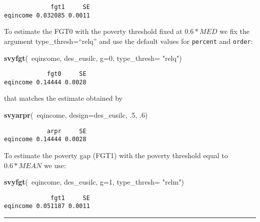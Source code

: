 \documentclass[]{book}
\newenvironment{Shaded}{\begin{snugshade}}{\end{snugshade}}
\newcommand{\KeywordTok}[1]{\textcolor[rgb]{0.13,0.29,0.53}{\textbf{{#1}}}}
\newcommand{\DataTypeTok}[1]{\textcolor[rgb]{0.13,0.29,0.53}{{#1}}}
\newcommand{\DecValTok}[1]{\textcolor[rgb]{0.00,0.00,0.81}{{#1}}}
\newcommand{\StringTok}[1]{\textcolor[rgb]{0.31,0.60,0.02}{{#1}}}
\newcommand{\NormalTok}[1]{{#1}}
\begin{document}
\begin{verbatim}
             fgt1     SE
eqincome 0.032085 0.0011
\end{verbatim}

To estimate the FGT0 with the poverty threshold fixed at \(0.6* MED\) we
fix the argument type\_thresh=``relq'' and use the default values for
\texttt{percent} and \texttt{order}:

\begin{Shaded}
\begin{Highlighting}[]
\KeywordTok{svyfgt}\NormalTok{(~eqincome, des_eusilc, }\DataTypeTok{g=}\DecValTok{0}\NormalTok{, }\DataTypeTok{type_thresh=} \StringTok{"relq"}\NormalTok{)}
\end{Highlighting}
\end{Shaded}

\begin{verbatim}
            fgt0     SE
eqincome 0.14444 0.0028
\end{verbatim}

that matches the estimate obtained by

\begin{Shaded}
\begin{Highlighting}[]
\KeywordTok{svyarpr}\NormalTok{(~eqincome, }\DataTypeTok{design=}\NormalTok{des_eusilc, .}\DecValTok{5}\NormalTok{, .}\DecValTok{6}\NormalTok{)}
\end{Highlighting}
\end{Shaded}

\begin{verbatim}
            arpr     SE
eqincome 0.14444 0.0028
\end{verbatim}

To estimate the poverty gap (FGT1) with the poverty threshold equal to
\(0.6*MEAN\) we use:

\begin{Shaded}
\begin{Highlighting}[]
\KeywordTok{svyfgt}\NormalTok{(~eqincome, des_eusilc, }\DataTypeTok{g=}\DecValTok{1}\NormalTok{, }\DataTypeTok{type_thresh=} \StringTok{"relm"}\NormalTok{)}
\end{Highlighting}
\end{Shaded}

\begin{verbatim}
             fgt1     SE
eqincome 0.051187 0.0011
\end{verbatim}

\begin{center}\rule{0.5\linewidth}{\linethickness}\end{center}
\end{document}
